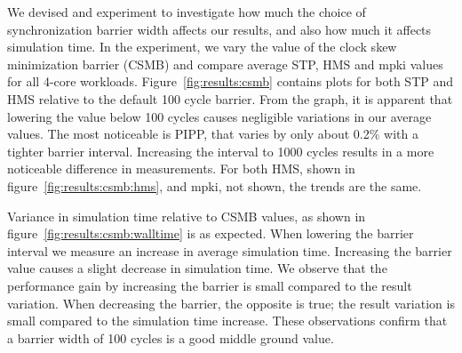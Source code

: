 We devised and experiment to investigate how much the choice of synchronization barrier width affects our results, and also how much it affects simulation time.
In the experiment, we vary the value of the clock skew minimization barrier (CSMB) and compare average STP, HMS and mpki values for all 4-core workloads.
Figure~\ref{fig:results:csmb} contains plots for both STP and HMS relative to the default 100 cycle barrier.
From the graph, it is apparent that lowering the value below 100 cycles causes negligible variations in our average values. 
The most noticeable is PIPP, that varies by only about 0.2\% with a tighter barrier interval.
Increasing the interval to 1000 cycles results in a more noticeable difference in measurements.
For both HMS, shown in figure~\ref{fig:results:csmb:hms}, and mpki, not shown, the trends are the same.

Variance in simulation time relative to CSMB values, as shown in figure~\ref{fig:results:csmb:walltime} is as expected. 
When lowering the barrier interval we measure an increase in average simulation time.
Increasing the barrier value causes a slight decrease in simulation time.
We observe that the performance gain by increasing the barrier is small compared to the result variation. 
When decreasing the barrier, the opposite is true; the result variation is small compared to the simulation time increase.
These observations confirm that a barrier width of 100 cycles is a good middle ground value.
